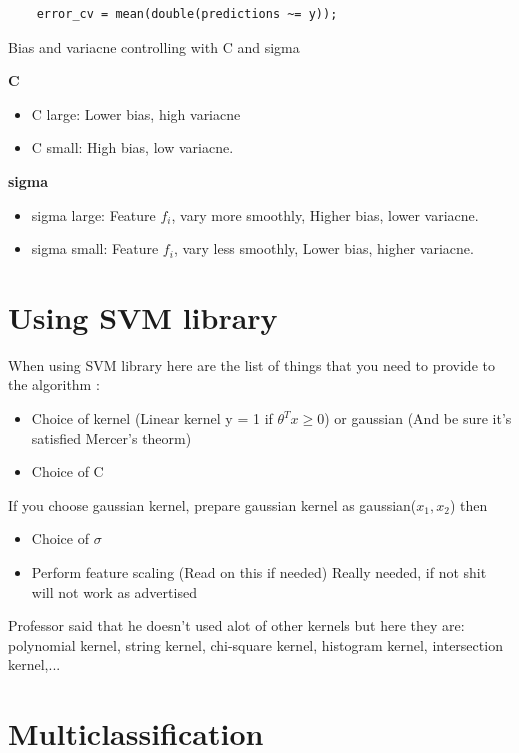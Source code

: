 \documentclass[30pt]{article}
\begin{document}
{\begin{verbatim}
	error_cv = mean(double(predictions ~= y));
\end{verbatim}

Bias and variacne controlling with C and sigma

\textbf{C}
\begin{itemize}
	\item C large: Lower bias, high variacne
	\item C small: High bias, low variacne.
\end{itemize}

\textbf{sigma}
\begin{itemize}
	\item sigma large: Feature $f_i$, vary more smoothly, Higher bias, lower variacne.
	\item sigma small: Feature $f_i$, vary less smoothly, Lower bias, higher variacne.
\end{itemize}

\section{Using SVM library}

When using SVM library here are the list of things that you need to provide to 
the algorithm :

\begin{itemize}
	\item Choice of kernel (Linear kernel y = 1 if $\theta^Tx \geq 0$) or gaussian
		(And be sure it's satisfied Mercer's theorm)
	\item Choice of C
\end{itemize}

If you choose gaussian kernel, prepare gaussian kernel as gaussian($x_1,x_2$) then

\begin{itemize}
	\item Choice of $\sigma$
	\item Perform feature scaling (Read on this if needed) Really needed, if not
		shit will not work as advertised
\end{itemize}

Professor said that he doesn't used alot of other kernels but here they are:
polynomial kernel, string kernel, chi-square kernel, histogram kernel, 	intersection
kernel,...

\section{Multiclassification}

}
\end{document}

